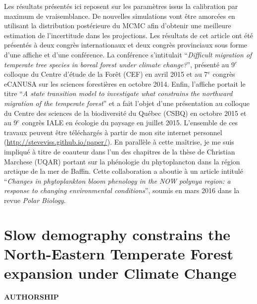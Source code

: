 Les résultats présentés ici reposent sur les paramètres issus la calibration par maximum de vraisemblance. De nouvelles simulations vont être amorcées en utilisant la distribution postérieure du MCMC afin d'obtenir une meilleure estimation de l'incertitude dans les projections. Les résultats de cet article ont été présentés à deux congrès internationaux et deux congrès provinciaux sous forme d'une affiche et d'une conférence. La conférence s'intitulait \enquote{\textit{Difficult migration of temperate tree species in boreal forest under climate change?}}, présenté au 9$^e$ colloque du Centre d'étude de la Forêt (CEF) en avril 2015 et au 7$^e$ congrès eCANUSA sur les sciences forestières en octobre 2014. Enfin, l'affiche portait le titre \enquote{\textit{A state transition model to investigate what constrains the northward migration of the temperate forest}} et a fait l'objet d'une présentation au colloque du Centre des sciences de la biodiversité du Québec (CSBQ) en octobre 2015 et au 9$^e$ congrès IALE en écologie du paysage en juillet 2015. L'ensemble de ces travaux peuvent être téléchargés à partir de mon site internet personnel (\url{http://steveviss.github.io/paper/}). En parallèle à cette maîtrise, je me suis impliqué à titre de coauteur dans l'un des chapitres de la thèse de Christian Marchese (UQAR) portant sur la phénologie du phytoplancton dans la région arctique de la mer de Baffin. Cette collaboration a aboutie à un article intitulé \enquote{\textit{Changes in phytoplankton bloom phenology in the NOW polynya region: a response to changing environmental conditions}}, soumis en mars 2016 dans la revue \textit{Polar Biology}.




\newpage

\section{Slow demography constrains the North-Eastern Temperate Forest expansion under Climate Change}

\textbf{AUTHORSHIP}
